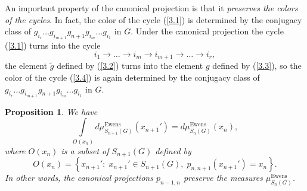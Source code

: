 \documentclass[12pt]{amsart}
\newtheorem{prop}[thm]{Proposition}
\theoremstyle{definition}
\numberwithin{equation}{section}
\DeclareMathOperator{\Ewens}{Ewens}
\begin{document}
An important property of the canonical projection is that it \textit{preserves the colors of the cycles}. In fact, the color of the cycle (\ref{3.1}) is determined by the conjugacy class of $g_{i_r}\ldots g_{i_{m+1}}g_{n+1}g_{i_m}\ldots g_{i_1}$
in $G$. Under the canonical projection the cycle (\ref{3.1}) turns into the cycle
\begin{equation}\label{3.4}
i_1\rightarrow\ldots\rightarrow i_m\rightarrow i_{m+1}\rightarrow\ldots\rightarrow i_r,
\end{equation}
the element $\tilde{g}$ defined by (\ref{3.2}) turns into the element $g$ defined by (\ref{3.3}), so the color of the cycle (\ref{3.4}) is again determined by the conjugacy class of $g_{i_r}\ldots g_{i_{m+1}}g_{n+1}g_{i_m}\ldots g_{i_1}$
in $G$.
\begin{prop}\label{PROPOSITIONCONISTECYEWENS}We have
\begin{equation}
\int\limits_{O(x_n)}d\mu^{\Ewens}_{S_{n+1}(G)}(x_{n+1}')=d\mu_{S_n(G)}^{\Ewens}(x_n),
\end{equation}
where  $O(x_n)$ is a subset of $S_{n+1}(G)$ defined by
\begin{equation}
O(x_n)=\left\{x_{n+1}':\; x_{n+1}'\in S_{n+1}(G),\; p_{n,n+1}(x_{n+1}')=x_n\right\}.
\end{equation}
In other words, the canonical projections $p_{n-1,n}$ preserve the measures $\mu^{\Ewens}_{S_{n}(G)}$.
\end{prop}
\end{document}
